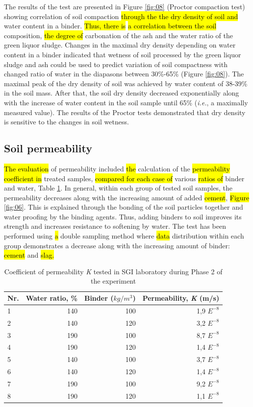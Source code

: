 \documentclass{amestyle}
\begin{document}
The results of the test are presented in Figure \ref{fig:08} (Proctor compaction test) showing correlation of soil compaction \hl{through the the dry density of soil and} water content in a binder. \hl{Thus, there is } \hl{a correlation between the soil} composition, \hl{the degree of} carbonation of the ash and the water ratio of the green liquor sludge. Changes in the maximal dry density depending on water content in a binder indicated that wetness of soil processed by the green liquor sludge and ash could be used to predict variation of soil compactness with changed ratio of water in the diapasons between 30\%-65\% (Figure \ref{fig:08}). The maximal peak of the dry density of soil was achieved by water content of 38-39\% in the soil mass. After that, the soil dry density decreased exponentially along with the increase of water content in the soil sample until 65\% (\emph{i.e.}, a maximally measured value). The results of the Proctor tests demonstrated that dry density is sensitive to the changes in soil wetness.

\subsection{Soil permeability}
 \hl{The evaluation} of permeability included \hl{the} calculation of the \hl{permeability coefficient in} treated\hl{ }samples, \hl{compared for each case of} various \hl{ratios of} binder and water, Table \ref{tab:1}. In general, within each group of tested soil samples, the permeability decreases along with the increasing amount of added \hl{cement}, \hl{Figure} \ref{fig:06}. This is explained through the bonding of the soil particles together and water proofing by the binding agents. Thus, adding binders to soil improves its strength and increases resistance to softening by water. The test has been performed using \hl{a} double sampling method where \hl{data }distribution within each group demonstrates a decrease along with the increasing amount of\hl{ }binder: \hl{cement} and \hl{slag.} 

\begin{table}[htbp]
  \caption{Coefficient of permeability \emph{K} tested in SGI laboratory during Phase 2 of the experiment}
  \label{tab:1}
  \centering
  \begin{tabular}{| l | r | r | r |}
    \hline
    \multicolumn{1}{|c|}{Nr.} &
    \multicolumn{1}{|c|}{Water ratio, \%} &
    \multicolumn{1}{|c|}{Binder ($kg/m^3$)} &
    \multicolumn{1}{|c|}{Permeability, \emph{K} (m/s)} \\\hline
    1 & 140 & 100 & 1,9 $E^{-8}$ \\
    2 & 140 & 120 & 3,2 $E^{-8}$ \\
    3 & 190 & 100 & 8,7 $E^{-8}$ \\
    4 & 190 & 120 & 1,4 $E^{-8}$ \\
    5 & 140 & 100 & 3,7 $E^{-8}$ \\
    6 & 140 & 120 & 1,4 $E^{-8}$ \\
    7 & 190 & 100 & 9,2 $E^{-8}$ \\
    8 & 190 & 120 & 1,1 $E^{-8}$ \\\hline
  \end{tabular}
\end{table}
\end{document}
